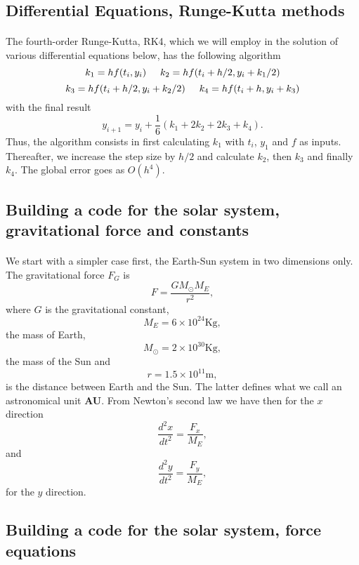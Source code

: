 \documentclass[%
oneside,                 %
final,                   %
10pt]{article}
\begin{document}
\subsection{Differential Equations, Runge-Kutta methods}

\paragraph{}
The fourth-order Runge-Kutta, RK4, which we will employ in the solution of various differential equations below, has the following algorithm
\[
  k_1=hf(t_i,y_i) \hspace{0.5cm}   k_2=hf(t_i+h/2,y_i+k_1/2)
\]
\[
  k_3=hf(t_i+h/2,y_i+k_2/2)\hspace{0.5cm}   k_4=hf(t_i+h,y_i+k_3)
\]
with the final result
\[
  y_{i+1}=y_i +\frac{1}{6}\left( k_1 +2k_2+2k_3+k_4\right).
\]
Thus, the algorithm consists in first calculating $k_1$ 
with $t_i$, $y_1$ and $f$ as inputs. Thereafter, we increase the step
size by $h/2$ and calculate $k_2$, then $k_3$ and finally $k_4$. The global error goes as $O(h^4)$.



\subsection{Building a code for the solar system, gravitational force and constants}

\paragraph{}
We start with a simpler case first, the Earth-Sun system  in two dimensions only.  The gravitational force $F_G$ is  
  \[
      F=\frac{GM_{\odot}M_E}{r^2},
  \]
where $G$ is the gravitational constant, 
\[
M_E=6\times 10^{24}\mathrm{Kg},
\]
the mass of Earth, 
\[
M_{\odot}=2\times 10^{30}\mathrm{Kg}, 
\]
the mass of the Sun and 
\[
r=1.5\times 10^{11}\mathrm{m}, 
\]
is the distance between Earth and the Sun. The latter defines what we call an astronomical unit \textbf{AU}.
From Newton's second law we have then for the $x$ direction
  \[
   \frac{d^2x}{dt^2}=\frac{F_{x}}{M_E},
  \]
and
  \[
   \frac{d^2y}{dt^2}=\frac{F_{y}}{M_E},
  \]
for the $y$ direction.




\subsection{Building a code for the solar system, force equations}
\end{document}
